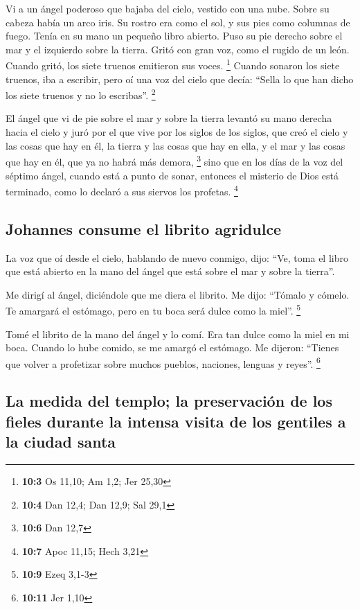  Vi a un ángel poderoso que bajaba del cielo, vestido con
una nube. Sobre su cabeza había un arco iris. Su rostro era como el sol,
y sus pies como columnas de fuego.  Tenía en su mano un
pequeño libro abierto. Puso su pie derecho sobre el mar y el izquierdo
sobre la tierra.  Gritó con gran voz, como el rugido de un
león. Cuando gritó, los siete truenos emitieron sus voces. \footnote{\textbf{10:3}
  Os 11,10; Am 1,2; Jer 25,30}  Cuando sonaron los siete
truenos, iba a escribir, pero oí una voz del cielo que decía: ``Sella lo
que han dicho los siete truenos y no lo escribas''. \footnote{\textbf{10:4}
  Dan 12,4; Dan 12,9; Sal 29,1}

 El ángel que vi de pie sobre el mar y sobre la tierra
levantó su mano derecha hacia el cielo  y juró por el que
vive por los siglos de los siglos, que creó el cielo y las cosas que hay
en él, la tierra y las cosas que hay en ella, y el mar y las cosas que
hay en él, que ya no habrá más demora, \footnote{\textbf{10:6} Dan 12,7}
 sino que en los días de la voz del séptimo ángel, cuando
está a punto de sonar, entonces el misterio de Dios está terminado, como
lo declaró a sus siervos los profetas. \footnote{\textbf{10:7} Apoc
  11,15; Hech 3,21}

\hypertarget{johannes-consume-el-librito-agridulce}{%
\subsection{Johannes consume el librito
agridulce}\label{johannes-consume-el-librito-agridulce}}

 La voz que oí desde el cielo, hablando de nuevo conmigo,
dijo: ``Ve, toma el libro que está abierto en la mano del ángel que está
sobre el mar y sobre la tierra''.

 Me dirigí al ángel, diciéndole que me diera el librito.
Me dijo: ``Tómalo y cómelo. Te amargará el estómago, pero en tu boca
será dulce como la miel''. \footnote{\textbf{10:9} Ezeq 3,1-3}

 Tomé el librito de la mano del ángel y lo comí. Era tan
dulce como la miel en mi boca. Cuando lo hube comido, se me amargó el
estómago.  Me dijeron: ``Tienes que volver a profetizar
sobre muchos pueblos, naciones, lenguas y reyes''. \footnote{\textbf{10:11}
  Jer 1,10}

\hypertarget{la-medida-del-templo-la-preservaciuxf3n-de-los-fieles-durante-la-intensa-visita-de-los-gentiles-a-la-ciudad-santa}{%
\subsection{La medida del templo; la preservación de los fieles durante
la intensa visita de los gentiles a la ciudad
santa}\label{la-medida-del-templo-la-preservaciuxf3n-de-los-fieles-durante-la-intensa-visita-de-los-gentiles-a-la-ciudad-santa}}

